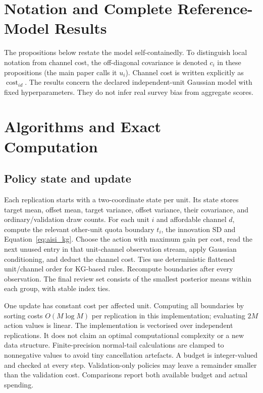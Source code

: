 \section{Notation and Complete Reference-Model Results}
The propositions below restate the model self-containedly. To distinguish local notation from channel cost, the off-diagonal covariance is denoted $c_i$ in these propositions (the main paper calls it $u_i$). Channel cost is written explicitly as $\operatorname{cost}_{id}$. The results concern the declared independent-unit Gaussian model with fixed hyperparameters. They do not infer real survey bias from aggregate scores.



\section{Algorithms and Exact Computation}
\subsection{Policy state and update}
Each replication starts with a two-coordinate state per unit. Its state stores target mean, offset mean, target variance, offset variance, their covariance, and ordinary/validation draw counts. For each unit $i$ and affordable channel $d$, compute the relevant other-unit quota boundary $t_i$, the innovation SD and Equation~\eqref{eq:aisi_kg}. Choose the action with maximum gain per cost, read the next unused entry in that unit-channel observation stream, apply Gaussian conditioning, and deduct the channel cost. Ties use deterministic flattened unit/channel order for KG-based rules. Recompute boundaries after every observation. The final review set consists of the smallest posterior means within each group, with stable index ties.

One update has constant cost per affected unit. Computing all boundaries by sorting costs $O(M\log M)$ per replication in this implementation; evaluating $2M$ action values is linear. The implementation is vectorised over independent replications. It does not claim an optimal computational complexity or a new data structure. Finite-precision normal-tail calculations are clamped to nonnegative values to avoid tiny cancellation artefacts. A budget is integer-valued and checked at every step. Validation-only policies may leave a remainder smaller than the validation cost. Comparisons report both available budget and actual spending.

